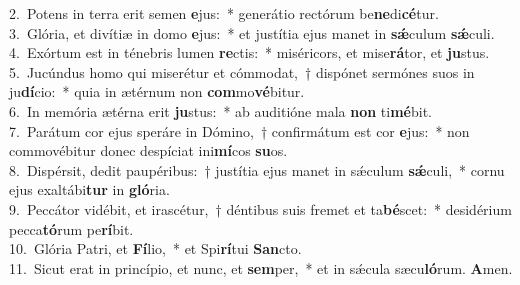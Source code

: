 {2.~}Potens in terra erit semen \textbf{e}jus:~* generátio rectórum be\textbf{ne}di\textbf{cé}tur.\\
{3.~}Glória, et divítiæ in domo \textbf{e}jus:~* et justítia ejus manet in \textbf{sǽ}culum \textbf{sǽ}culi.\\
{4.~}Exórtum est in ténebris lumen \textbf{re}ctis:~* miséricors, et mise\textbf{rá}tor, et \textbf{ju}stus.\\
{5.~}Jucúndus homo qui miserétur et cómmodat,~† dispónet sermónes suos in ju\textbf{dí}cio:~* quia in ætérnum non \textbf{com}mo\textbf{vé}bitur.\\
{6.~}In memória ætérna erit \textbf{ju}stus:~* ab auditióne mala \textbf{non} ti\textbf{mé}bit.\\
{7.~}Parátum cor ejus speráre in Dómino,~† confirmátum est cor \textbf{e}jus:~* non commovébitur donec despíciat ini\textbf{mí}cos \textbf{su}os.\\
{8.~}Dispérsit, dedit paupéribus:~† justítia ejus manet in sǽculum \textbf{sǽ}culi,~* cornu ejus exaltábi\textbf{tur} in \textbf{gló}ria.\\
{9.~}Peccátor vidébit, et irascétur,~† déntibus suis fremet et ta\textbf{bé}scet:~* desidérium pecca\textbf{tó}rum pe\textbf{rí}bit.\\
{10.~}Glória Patri, et \textbf{Fí}lio,~* et Spi\textbf{rí}tui \textbf{San}cto.\\
{11.~}Sicut erat in princípio, et nunc, et \textbf{sem}per,~* et in sǽcula sæcu\textbf{ló}rum. \textbf{A}men.\\
